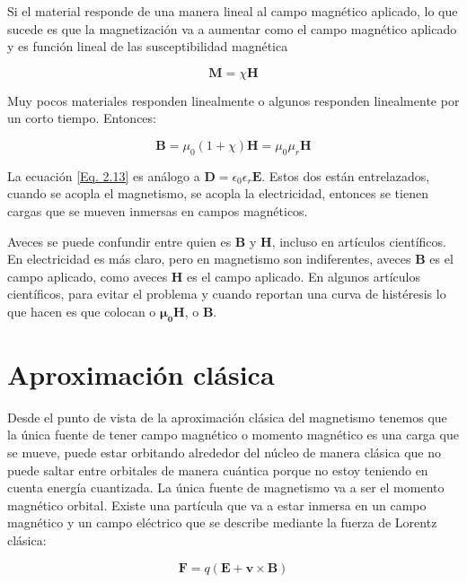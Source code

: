 \documentclass[11pt,fleqn]{book}
\renewcommand{\vec}[1]{\mathbf{#1}}
\begin{document}
Si el material responde de una manera lineal al campo magnético aplicado, lo que sucede es que la magnetización va a aumentar como el campo magnético aplicado y es función lineal de las susceptibilidad magnética 

\begin{equation}
    \vec{M}=\chi\vec{H}
    \label{Eq. 2.12}
\end{equation}

Muy pocos materiales responden linealmente o algunos responden linealmente por un corto tiempo. Entonces:

\begin{equation}
    \vec{B}=\mu_{0}(1+\chi)\vec{H}=\mu_{0}\mu_{r}\vec{H}
    \label{Eq. 2.13}
\end{equation}

La ecuación \ref{Eq. 2.13} es análogo a $\vec{D}=\epsilon_{0}\epsilon_{r}\vec{E}$. Estos dos están entrelazados, cuando se acopla el magnetismo, se acopla la electricidad, entonces se tienen cargas que se mueven inmersas en campos magnéticos. 

\begin{remark}
Aveces se puede confundir entre quien es $\vec{B}$ y $\vec{H}$, incluso en artículos científicos. En electricidad es más claro, pero en magnetismo son indiferentes, aveces $\vec{B}$ es el campo aplicado, como aveces $\vec{H}$ es el campo aplicado. En algunos artículos científicos, para evitar el problema y cuando reportan una curva de histéresis lo que hacen es que colocan o $\vec{\mu_{0}}\vec{H}$, o $\vec{B}$.
\end{remark}

\section{Aproximación clásica}

Desde el punto de vista de la aproximación clásica del magnetismo tenemos que la única fuente de tener campo magnético o momento magnético es una carga que se mueve, puede estar orbitando alrededor del núcleo de manera clásica que no puede saltar entre orbitales de manera cuántica porque no estoy teniendo en cuenta energía cuantizada. La única fuente de magnetismo va a ser el momento magnético orbital. Existe una partícula que va a estar inmersa en un campo magnético y un campo eléctrico que se describe mediante la fuerza de Lorentz clásica:

\begin{equation}
    \vec{F}=q\left(\vec{E+v\times\vec{B}}\right)
    \label{Eq. 2.14}
\end{equation}
\end{document}
